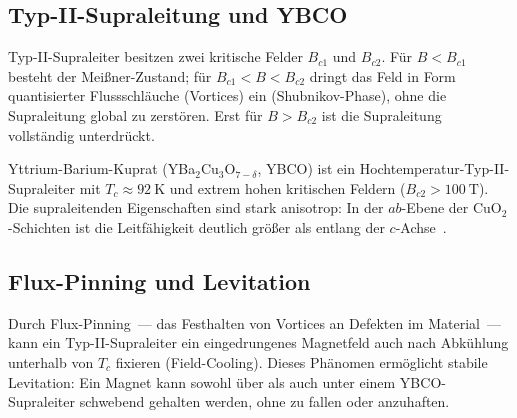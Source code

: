 \subsection{Typ-II-Supraleitung und YBCO}

Typ-II-Supraleiter besitzen zwei kritische Felder $B_{c1}$ und $B_{c2}$.
Für $B < B_{c1}$ besteht der Meißner-Zustand; für $B_{c1} < B < B_{c2}$ dringt das Feld in Form quantisierter Flussschläuche (Vortices) ein (Shubnikov-Phase), ohne die Supraleitung global zu zerstören.
Erst für $B > B_{c2}$ ist die Supraleitung vollständig unterdrückt.

Yttrium-Barium-Kuprat (YBa$_2$Cu$_3$O$_{7-\delta}$, YBCO) ist ein Hochtemperatur-Typ-II-Supraleiter mit $T_c \approx 92~\mathrm{K}$ und extrem hohen kritischen Feldern ($B_{c2} > 100~\mathrm{T}$).
Die supraleitenden Eigenschaften sind stark anisotrop: In der $ab$-Ebene der CuO$_2$-Schichten ist die Leitfähigkeit deutlich größer als entlang der $c$-Achse~\cite{Buckel2013}.

\subsection{Flux-Pinning und Levitation}

Durch Flux-Pinning~--- das Festhalten von Vortices an Defekten im Material~--- kann ein Typ-II-Supraleiter ein eingedrungenes Magnetfeld auch nach Abkühlung unterhalb von $T_c$ fixieren (Field-Cooling).
Dieses Phänomen ermöglicht stabile Levitation: Ein Magnet kann sowohl über als auch unter einem YBCO-Supraleiter schwebend gehalten werden, ohne zu fallen oder anzuhaften.
